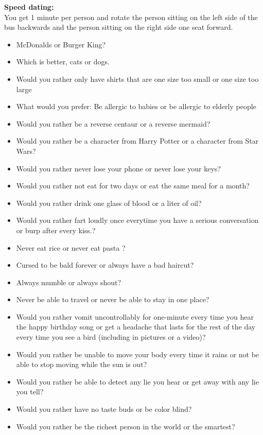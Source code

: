 \documentclass[../../../main.tex]{subfiles}
\begin{document}
\textbf{Speed dating:}\\
You get 1 minute per person and rotate the person sitting on the left side of the bus backwards and the person sitting on the right side one seat forward.
\begin{itemize}
    \item McDonalds or Burger King?
    \item Which is better, cats or dogs.
    \item Would you rather only have shirts that are one size too small or one size too large
    \item What would you prefer: Be allergic to babies or be allergic to elderly people
    \item Would you rather be a reverse centaur or a reverse mermaid?
    \item Would you rather be a character from Harry Potter or a character from Star Wars?
    \item Would you rather never lose your phone or never lose your keys?
    \item Would you rather not eat for two days or eat the same meal for a month?
    \item Would you rather drink one glass of blood or a liter of oil?
    \item Would you rather fart loudly once everytime you have a serious conversation or burp after every kiss.?
    \item Never eat rice or never eat pasta ?
    \item Cursed to be bald forever or always have a bad haircut?
    \item Always mumble or always shout?
    \item Never be able to travel or never be able to stay in one place?
    \item Would you rather vomit uncontrollably for one-minute every time you hear the happy birthday song or get a headache that lasts for the rest of the day every time you see a bird (including in pictures or a video)?
    \item Would you rather be unable to move your body every time it rains or not be able to stop moving while the sun is out?
    \item Would you rather be able to detect any lie you hear or get away with any lie you tell?
    \item Would you rather have no taste buds or be color blind?
    \item Would you rather be the richest person in the world or the smartest?

\end{itemize}
\end{document}
